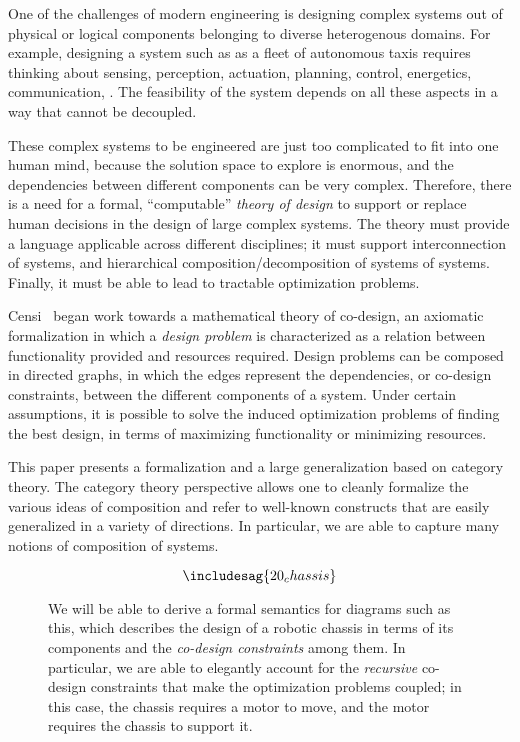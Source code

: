 One of the challenges of modern engineering is designing complex systems out
of physical or logical components belonging to diverse heterogenous domains.
For example, designing a system such as as a fleet of autonomous taxis
requires thinking about sensing, perception, actuation, planning, control,
energetics, communication, \etc. The feasibility of the system depends on all
these aspects in a way that cannot be decoupled.

These complex systems to be engineered are just too complicated to
fit into one human mind, because the solution space to explore is enormous,
and the dependencies between different components can be very complex.
Therefore, there is a need for a formal, ``computable'' \emph{theory of design} to
support or replace human decisions in the design of large complex systems.
The theory must provide a language applicable across different disciplines;
it must support interconnection of systems, and hierarchical composition/decomposition of systems of systems.
Finally,
it must be able to lead to tractable optimization problems.

Censi~\cite{Censi2017} began work towards a mathematical theory of co-design,
an axiomatic formalization in which a \emph{design problem} is characterized
as a relation between functionality provided and resources required.
Design
problems can be composed in directed graphs, in which the edges represent
the dependencies, or co-design constraints, between the different components
of a system.
Under certain assumptions, it is possible to solve the induced
optimization problems of finding the best design, in terms of maximizing
functionality or minimizing resources.

This paper presents a formalization and a large generalization based on
category theory.
The category theory perspective allows one to cleanly
formalize the various ideas of composition and refer to well-known
constructs that are easily generalized in a variety of directions.
In particular, we are able to capture many notions of composition
of systems.

\begin{figure}[h!]
    \begin{equation}
        \label{eq:chassis}
        \includesag{20_chassis}
    \end{equation}
    \caption{
        We will be able to derive a formal semantics for diagrams such as this, which describes the design of a robotic chassis in terms of its components and the \emph{co-design constraints} among them.
        In particular, we are able to elegantly account for the \emph{recursive} co-design constraints that make the optimization problems coupled; in this case, the chassis requires a motor to move, and the motor requires the chassis to support it.
    }
\end{figure}


